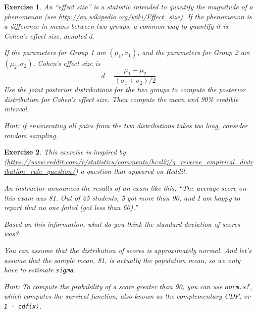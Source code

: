 \documentclass[12pt]{book}
\theoremstyle{exercise}
\newtheorem{exercise}{Exercise}[chapter]
\newcommand{\py}[1]{{\tt #1}}%
\begin{document}
\begin{exercise}
An ``effect size'' is a statistic intended to quantify the magnitude of a phenomenon (see \url{http://en.wikipedia.org/wiki/Effect_size}).
If the phenomenon is a difference in means between two groups, a common way to quantify it is Cohen's effect size, denoted $d$.

If the parameters for Group 1 are $(\mu_1, \sigma_1)$, and the
parameters for Group 2 are $(\mu_2, \sigma_2)$, Cohen's
effect size is
%
\[ d = \frac{\mu_1 - \mu_2}{(\sigma_1 + \sigma_2)/2} \]
%
Use the joint posterior distributions for the two groups to compute the posterior distribution for Cohen's effect size.
Then compute the mean and 90\% credible interval.

Hint: if enumerating all pairs from the two distributions takes too
long, consider random sampling.
\end{exercise}


\begin{exercise}
This exercise is inspired by
(\url{https://www.reddit.com/r/statistics/comments/hcvl2j/q_reverse_empirical_distribution_rule_question/}) a
question that appeared on Reddit.

An instructor announces the results of an exam like this, ``The average
score on this exam was 81. Out of 25 students, 5 got more than 90, and I
am happy to report that no one failed (got less than 60).''

Based on this information, what do you think the standard deviation of
scores was?

You can assume that the distribution of scores is approximately normal.
And let's assume that the sample mean, 81, is actually the population
mean, so we only have to estimate \py{sigma}.

Hint: To compute the probability of a score greater than 90, you can use
\py{norm.sf}, which computes the survival function,
also known as the complementary CDF, or
\py{1 - cdf(x)}.

\end{exercise}
\end{document}
